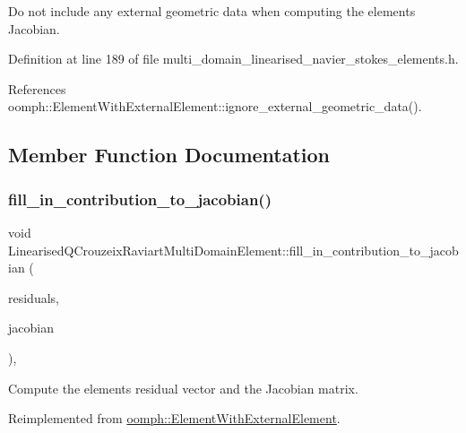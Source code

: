 Do not include any external geometric data when computing the element\textquotesingle{}s Jacobian. 

Definition at line 189 of file multi\+\_\+domain\+\_\+linearised\+\_\+navier\+\_\+stokes\+\_\+elements.\+h.



References oomph\+::\+Element\+With\+External\+Element\+::ignore\+\_\+external\+\_\+geometric\+\_\+data().



\subsection{Member Function Documentation}
\mbox{\label{classLinearisedQCrouzeixRaviartMultiDomainElement_a7798d37a41ab3e965da4142b1731a9e4}} 
\subsubsection{\texorpdfstring{fill\+\_\+in\+\_\+contribution\+\_\+to\+\_\+jacobian()}{fill\_in\_contribution\_to\_jacobian()}}
{\footnotesize\ttfamily void Linearised\+Q\+Crouzeix\+Raviart\+Multi\+Domain\+Element\+::fill\+\_\+in\+\_\+contribution\+\_\+to\+\_\+jacobian (\begin{DoxyParamCaption}\item[{\hyperlink{classoomph_1_1Vector}{Vector}$<$ double $>$ \&}]{residuals,  }\item[{\hyperlink{classoomph_1_1DenseMatrix}{Dense\+Matrix}$<$ double $>$ \&}]{jacobian }\end{DoxyParamCaption})\hspace{0.3cm}{\ttfamily [inline]}, {\ttfamily [virtual]}}



Compute the element\textquotesingle{}s residual vector and the Jacobian matrix. 



Reimplemented from \hyperlink{classoomph_1_1ElementWithExternalElement_ae5fb09552a8271e891438f8d058ca1b8}{oomph\+::\+Element\+With\+External\+Element}.



